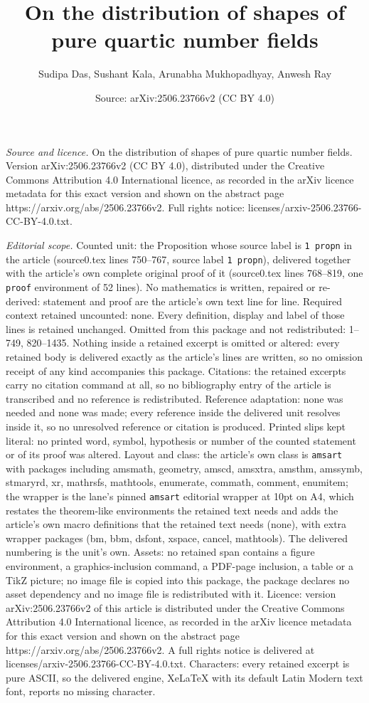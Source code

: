 \documentclass[10pt,a4paper]{amsart}
\title[On the distribution of shapes of pure quartic number fields]{On the distribution of shapes of pure quartic number fields}
\author{Sudipa Das, Sushant Kala, Arunabha Mukhopadhyay, Anwesh Ray}
\date{Source: arXiv:2506.23766v2 (CC BY 4.0)}
\begin{document}
\maketitle

\noindent\emph{Source and licence.} On the distribution of shapes of pure quartic number fields. Version arXiv:2506.23766v2 (CC BY 4.0), distributed under the Creative Commons Attribution 4.0 International licence, as recorded in the arXiv licence metadata for this exact version and shown on the abstract page https://arxiv.org/abs/2506.23766v2. Full rights notice: licenses/arxiv-2506.23766-CC-BY-4.0.txt.\par\smallskip

\noindent\textit{Editorial scope.} Counted unit: the Proposition whose source label is \texttt{1 propn} in the article (source0.tex lines 750--767, source label \texttt{1 propn}), delivered together with the article's own complete original proof of it (source0.tex lines 768--819, one \texttt{proof} environment of 52 lines). No mathematics is written, repaired or re-derived: statement and proof are the article's own text line for line. Required context retained uncounted: none. Every definition, display and label of those lines is retained unchanged. Omitted from this package and not redistributed: 1--749, 820--1435. Nothing inside a retained excerpt is omitted or altered: every retained body is delivered exactly as the article's lines are written, so no omission receipt of any kind accompanies this package. Citations: the retained excerpts carry no citation command at all, so no bibliography entry of the article is transcribed and no reference is redistributed. Reference adaptation: none was needed and none was made; every reference inside the delivered unit resolves inside it, so no unresolved reference or citation is produced. Printed slips kept literal: no printed word, symbol, hypothesis or number of the counted statement or of its proof was altered. Layout and class: the article's own class is \texttt{amsart} with packages including amsmath, geometry, amscd, amsxtra, amsthm, amssymb, stmaryrd, xr, mathrsfs, mathtools, enumerate, commath, comment, enumitem; the wrapper is the lane's pinned \texttt{amsart} editorial wrapper at 10pt on A4, which restates the theorem-like environments the retained text needs and adds the article's own macro definitions that the retained text needs (none), with extra wrapper packages (bm, bbm, dsfont, xspace, cancel, mathtools). The delivered numbering is the unit's own. Assets: no retained span contains a figure environment, a graphics-inclusion command, a PDF-page inclusion, a table or a TikZ picture; no image file is copied into this package, the package declares no asset dependency and no image file is redistributed with it. Licence: version arXiv:2506.23766v2 of this article is distributed under the Creative Commons Attribution 4.0 International licence, as recorded in the arXiv licence metadata for this exact version and shown on the abstract page https://arxiv.org/abs/2506.23766v2. A full rights notice is delivered at licenses/arxiv-2506.23766-CC-BY-4.0.txt. Characters: every retained excerpt is pure ASCII, so the delivered engine, XeLaTeX with its default Latin Modern text font, reports no missing character.
\end{document}
